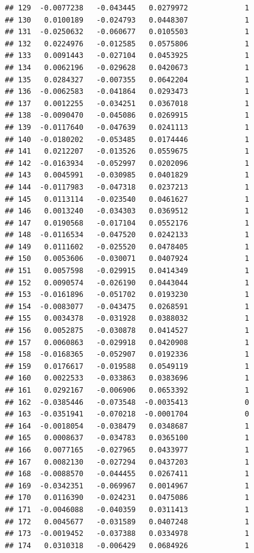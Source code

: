 \documentclass[12pt]{article}\usepackage[]{graphicx}\usepackage[]{xcolor}
\makeatletter
\newenvironment{kframe}{%
 \def\at@end@of@kframe{}%
 \ifinner\ifhmode%
  \def\at@end@of@kframe{\end{minipage}}%
  \begin{minipage}{\columnwidth}%
 \fi\fi%
 \def\FrameCommand##1{\hskip\@totalleftmargin \hskip-\fboxsep
 \colorbox{shadecolor}{##1}\hskip-\fboxsep
     \hskip-\linewidth \hskip-\@totalleftmargin \hskip\columnwidth}%
 \MakeFramed {\advance\hsize-\width
   \@totalleftmargin\z@ \linewidth\hsize
   \@setminipage}}%
 {\par\unskip\endMakeFramed%
 \at@end@of@kframe}
\newenvironment{knitrout}{}{} %
\makeatother
\begin{document}
\begin{knitrout}
\begin{kframe}
\begin{verbatim}
## 129  -0.0077238   -0.043445   0.0279972             1
## 130   0.0100189   -0.024793   0.0448307             1
## 131  -0.0250632   -0.060677   0.0105503             1
## 132   0.0224976   -0.012585   0.0575806             1
## 133   0.0091443   -0.027104   0.0453925             1
## 134   0.0062196   -0.029628   0.0420673             1
## 135   0.0284327   -0.007355   0.0642204             1
## 136  -0.0062583   -0.041864   0.0293473             1
## 137   0.0012255   -0.034251   0.0367018             1
## 138  -0.0090470   -0.045086   0.0269915             1
## 139  -0.0117640   -0.047639   0.0241113             1
## 140  -0.0180202   -0.053485   0.0174446             1
## 141   0.0212207   -0.013526   0.0559675             1
## 142  -0.0163934   -0.052997   0.0202096             1
## 143   0.0045991   -0.030985   0.0401829             1
## 144  -0.0117983   -0.047318   0.0237213             1
## 145   0.0113114   -0.023540   0.0461627             1
## 146   0.0013240   -0.034303   0.0369512             1
## 147   0.0190568   -0.017104   0.0552176             1
## 148  -0.0116534   -0.047520   0.0242133             1
## 149   0.0111602   -0.025520   0.0478405             1
## 150   0.0053606   -0.030071   0.0407924             1
## 151   0.0057598   -0.029915   0.0414349             1
## 152   0.0090574   -0.026190   0.0443044             1
## 153  -0.0161896   -0.051702   0.0193230             1
## 154  -0.0083077   -0.043475   0.0268591             1
## 155   0.0034378   -0.031928   0.0388032             1
## 156   0.0052875   -0.030878   0.0414527             1
## 157   0.0060863   -0.029918   0.0420908             1
## 158  -0.0168365   -0.052907   0.0192336             1
## 159   0.0176617   -0.019588   0.0549119             1
## 160   0.0022533   -0.033863   0.0383696             1
## 161   0.0292167   -0.006906   0.0653392             1
## 162  -0.0385446   -0.073548  -0.0035413             0
## 163  -0.0351941   -0.070218  -0.0001704             0
## 164  -0.0018054   -0.038479   0.0348687             1
## 165   0.0008637   -0.034783   0.0365100             1
## 166   0.0077165   -0.027965   0.0433977             1
## 167   0.0082130   -0.027294   0.0437203             1
## 168  -0.0088570   -0.044455   0.0267411             1
## 169  -0.0342351   -0.069967   0.0014967             1
## 170   0.0116390   -0.024231   0.0475086             1
## 171  -0.0046088   -0.040359   0.0311413             1
## 172   0.0045677   -0.031589   0.0407248             1
## 173  -0.0019452   -0.037388   0.0334978             1
## 174   0.0310318   -0.006429   0.0684926             1

\end{verbatim}
\end{kframe}
\end{knitrout}
\end{document}
